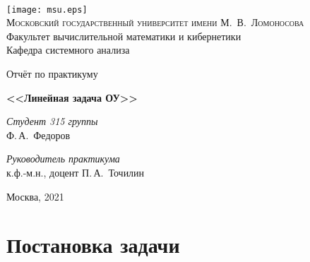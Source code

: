 \documentclass[11pt]{article}
\begin{document}
\thispagestyle{empty}

\begin{center}
\ \vspace{-3cm}

\texttt{[image: msu.eps]}\\
{\scshape Московский государственный университет имени М.~В.~Ломоносова}\\
Факультет вычислительной математики и кибернетики\\
Кафедра системного анализа

\vfill

{\LARGE Отчёт по практикуму}

\vspace{1cm}

{\Huge\bfseries <<Линейная задача ОУ>>}
\end{center}

\vspace{1cm}

\begin{flushright}
  \large
  \textit{Студент 315 группы}\\
  Ф.\,А.~Федоров

  \vspace{5mm}

  \textit{Руководитель практикума}\\
  к.ф.-м.н., доцент П.\,А.~Точилин
\end{flushright}

\vfill

\begin{center}
Москва, 2021
\end{center}

\newpage
\tableofcontents

\newpage
\section{Постановка задачи}
\end{document}
